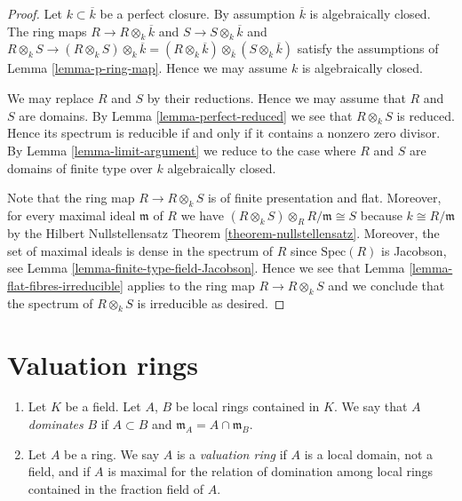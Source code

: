 \begin{proof}
Let $k \subset \overline{k}$ be a perfect closure.
By assumption $\overline{k}$ is algebraically closed.
The ring maps $R \to R\otimes_k \overline{k}$ and
$S \to S \otimes_k \overline{k}$ and
$R \otimes_k S \to (R \otimes_k S) \otimes_k \overline{k}
= (R \otimes_k \overline{k}) \otimes_{\overline{k}} (S \otimes_k \overline{k})$
satisfy the assumptions of Lemma \ref{lemma-p-ring-map}.
Hence we may assume $k$ is algebraically closed.

\medskip\noindent
We may replace $R$ and $S$ by their reductions.
Hence we may assume that $R$ and $S$ are domains.
By Lemma \ref{lemma-perfect-reduced} we see that $R \otimes_k S$ is
reduced. Hence its spectrum is reducible if and only if it contains a nonzero
zero divisor. By Lemma \ref{lemma-limit-argument} we reduce to the case where
$R$ and $S$ are domains of finite type over $k$ algebraically closed.

\medskip\noindent
Note that the ring map $R \to R \otimes_k S$ is of finite
presentation and flat. Moreover, for every maximal ideal
$\mathfrak m$ of $R$ we have
$(R \otimes_k S) \otimes_R R/\mathfrak m \cong S$ because
$k \cong R/\mathfrak m$ by the Hilbert Nullstellensatz Theorem
\ref{theorem-nullstellensatz}. Moreover, the set of
maximal ideals is dense in the spectrum of $R$ since
$\text{Spec}(R)$ is Jacobson, see Lemma \ref{lemma-finite-type-field-Jacobson}.
Hence we see that Lemma \ref{lemma-flat-fibres-irreducible} applies
to the ring map $R \to R \otimes_k S$ and we conclude that
the spectrum of $R \otimes_k S$ is irreducible as desired.
\end{proof}



















\section{Valuation rings}
\label{section-valuation-rings}

\begin{definition}
\label{definition-valuation-ring}
\begin{enumerate}
\item Let $K$ be a field. Let $A$, $B$ be local rings contained
in $K$. We say that $A$ {\it dominates} $B$ if $A \subset B$
and $\mathfrak m_A = A \cap \mathfrak m_B$.
\item Let $A$ be a ring. We say $A$ is a {\it valuation ring}
if $A$ is a local domain, not a field, and if $A$ is maximal
for the relation of domination among local rings contained in
the fraction field of $A$.
\end{enumerate}
\end{definition}

